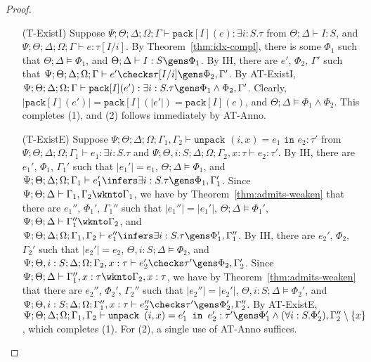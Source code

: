 \begin{proof}
\begin{itemize}
  \item[(T-ExistI)] Suppose $\Psi ; \Theta ; \Delta ; \Omega ; \Gamma\vdash \texttt{pack}[I](e) : \exists i:S.\tau$ from
  $\Theta ; \Delta \vdash I : S$, and
  $\Psi ; \Theta ; \Delta ; \Omega ; \Gamma\vdash e : \tau[I/i]$.
  By Theorem~\ref{thm:idx-compl}, there is some $\Phi_1$ such that
  $\Theta ; \Delta \vDash \Phi_1$, and
  $\Theta ; \Delta \vdash I : S \gens \Phi_1$.
  By IH, there are $e'$, $\Phi_2$, $\Gamma'$ such that
  $\Psi ; \Theta ; \Delta ; \Omega ; \Gamma \vdash e' \checks \tau[I/i] \gens \Phi_2,\Gamma'$.
  By AT-ExistI,
  $\Psi ; \Theta ; \Delta ; \Omega ; \Gamma\vdash \texttt{pack}[I](e') : \exists i:S.\tau \gens \Phi_1 \wedge \Phi_2,\Gamma'$.
  Clearly, $|\texttt{pack}[I](e')| = \texttt{pack}[I](|e'|) = \texttt{pack}[I](e)$, and $\Theta ; \Delta \vDash \Phi_1 \wedge \Phi_2$.
  This completes (1), and (2) follows immediately by AT-Anno.
  
  \item[(T-ExistE)] Suppose
  $\Psi ; \Theta ; \Delta ; \Omega ; \Gamma_1,\Gamma_2\vdash \texttt{unpack } (i,x) = e_1 \texttt{ in } e_2 : \tau'$ from
  $\Psi ; \Theta ; \Delta ; \Omega ; \Gamma_1\vdash e_1 : \exists i : S.\tau$ and
  $\Psi ; \Theta, i : S ; \Delta ; \Omega ; \Gamma_2, x : \tau \vdash e_2 : \tau'$.
  By IH, there are $e_1'$, $\Phi_1$, $\Gamma_1'$ such that
  $|e_1'| = e_1$,
  $\Theta ; \Delta \vDash \Phi_1$, and
  $\Psi ; \Theta ; \Delta ; \Omega ; \Gamma_1 \vdash e_1' \infers \exists i : S. \tau \gens \Phi_1,\Gamma_1'$.
  Since $\Psi ; \Theta ; \Delta \vdash \Gamma_1,\Gamma_2 \wknto \Gamma_1$,
  we have by Theorem~\ref{thm:admits-weaken} that there are $e_1''$, $\Phi_1'$, $\Gamma_1''$ such that
  $|e_1''| = |e_1'|$,
  $\Theta ; \Delta \vDash \Phi_1'$,
  $\Psi ; \Theta ; \Delta \vdash \Gamma_1'' \wknto \Gamma_2$, and
  $\Psi ; \Theta ; \Delta ; \Omega ; \Gamma_1,\Gamma_2 \vdash e_1'' \infers \exists i : S. \tau \gens \Phi_1',\Gamma_1''$.
  By IH, there are $e_2'$, $\Phi_2$, $\Gamma_2'$ such that
  $|e_2'| = e_2$,
  $\Theta, i : S ; \Delta \vDash \Phi_2$, and
  $\Psi ; \Theta, i : S ; \Delta ; \Omega ; \Gamma_2,x : \tau \vdash e_2' \checks \tau' \gens \Phi_2,\Gamma_2'$.
  Since $\Psi ; \Theta ; \Delta \vdash \Gamma_1'',x : \tau \wknto \Gamma_2, x : \tau$,
  we have by Theorem~\ref{thm:admits-weaken} that there are $e_2''$, $\Phi_2'$, $\Gamma_2''$ such that
  $|e_2''| = |e_2'|$,
  $\Theta, i : S ; \Delta \vDash \Phi_2'$, and
  $\Psi ; \Theta, i : S ; \Delta ; \Omega ; \Gamma_1'', x: \tau \vdash e_2'' \checks \tau' \gens \Phi_2',\Gamma_2''$.
  By AT-ExistE,
  $\Psi ; \Theta ; \Delta ; \Omega ; \Gamma_1,\Gamma_2\vdash \texttt{unpack } (i,x) = e_1' \texttt{ in } e_2' : \tau' \gens \Phi_1' \wedge (\forall i : S. \Phi_2'),\Gamma_2'' \setminus \{x\}$,
  which completes (1). For (2), a single use of AT-Anno suffices.
  

\end{itemize}
\end{proof}
